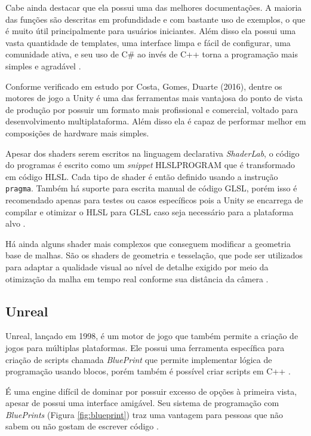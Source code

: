 Cabe ainda destacar que ela possui uma das melhores documentações. A maioria das funções são descritas em profundidade e com bastante uso de exemplos, o que é muito útil principalmente para usuários iniciantes. Além disso ela possui uma vasta quantidade de templates, uma interface limpa e fácil de configurar, uma comunidade ativa, e seu uso de C\# ao invés de C++ torna a programação mais simples e agradável \cite{compStudyGE}.

Conforme verificado em estudo por Costa, Gomes, Duarte (2016)\nocite{estudoUnity}, dentre os motores de jogo a Unity é uma das ferramentas mais vantajosa do ponto de vista de produção por possuir um formato mais profissional e comercial, voltado para desenvolvimento multiplataforma. Além disso ela é capaz de performar melhor em composições de hardware mais simples.

Apesar dos shaders serem escritos na linguagem declarativa \textit{ShaderLab}, o código do programas é escrito como um \textit{snippet} HLSLPROGRAM que é transformado em código HLSL. Cada tipo de shader é então definido usando a instrução \texttt{pragma}. Também há suporte para escrita manual de código GLSL, porém isso é recomendado apenas para testes ou casos específicos pois a Unity se encarrega de compilar e otimizar o HLSL para GLSL caso seja necessário para a plataforma alvo \cite{hasu2018modern}. 

Há ainda alguns shader mais complexos que conseguem modificar a geometria base de malhas. São os shaders de geometria e tesselação, que pode ser utilizados para adaptar a qualidade visual ao nível de detalhe exigido por meio da otimização da malha em tempo real conforme sua distância da câmera \cite{aino2020}.

\subsection{Unreal}
\label{sec:unreal}

Unreal, lançado em 1998, é um motor de jogo que também permite a criação de jogos para múltiplas plataformas. Ele possui uma ferramenta específica para criação de scripts chamada \textit{BluePrint} que permite implementar lógica de programação usando blocos, porém também é possível criar scripts em C++ \cite{compStudyGE}.

É uma engine difícil de dominar por possuir excesso de opções à primeira vista, apesar de possui uma interface amigável. Seu sistema de programação com \textit{BluePrints} (Figura \ref{fig:blueprint}) traz uma vantagem para pessoas que não sabem ou não gostam de escrever código \cite{compStudyGE}.

